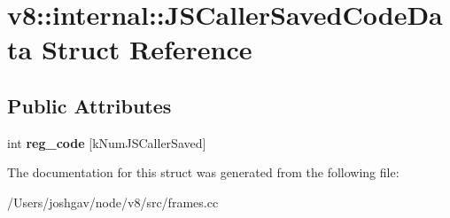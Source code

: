 \hypertarget{structv8_1_1internal_1_1_j_s_caller_saved_code_data}{}\section{v8\+:\+:internal\+:\+:J\+S\+Caller\+Saved\+Code\+Data Struct Reference}
\label{structv8_1_1internal_1_1_j_s_caller_saved_code_data}
\subsection*{Public Attributes}
\begin{DoxyCompactItemize}
\item 
int {\bfseries reg\+\_\+code} \mbox{[}k\+Num\+J\+S\+Caller\+Saved\mbox{]}\hypertarget{structv8_1_1internal_1_1_j_s_caller_saved_code_data_aac079f7a23ad6fb19c3c81ec262850fb}{}\label{structv8_1_1internal_1_1_j_s_caller_saved_code_data_aac079f7a23ad6fb19c3c81ec262850fb}

\end{DoxyCompactItemize}


The documentation for this struct was generated from the following file\+:\begin{DoxyCompactItemize}
\item 
/\+Users/joshgav/node/v8/src/frames.\+cc\end{DoxyCompactItemize}
